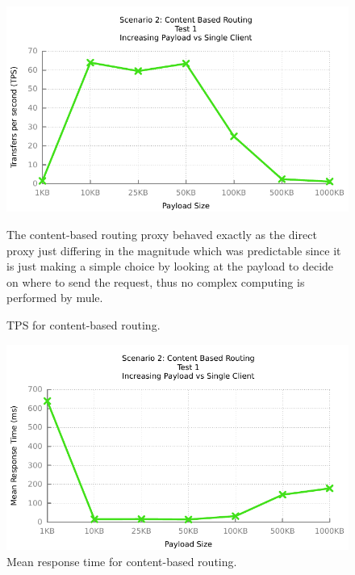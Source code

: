 \begin{figure}[H]
	\caption{TPS for content-based routing.}
	\centerline{\includegraphics{img/mediation_fu_ip_tps}}
	\label{fig:mediation-1-1}
	The content-based routing proxy behaved exactly as the direct proxy just differing in the magnitude which was predictable since it is just making a simple choice by looking at the payload to decide on where to send the request, thus no complex computing is performed by mule.
\end{figure}

\begin{figure}[H]
	\caption{Mean response time for content-based routing.}
	\centerline{\includegraphics{img/mediation_fu_ip_resp}}
	\label{fig:mediation-1-2}
\end{figure}

